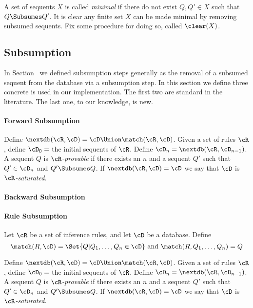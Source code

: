\begin{definition}
  A set of sequents $X$ is called \emph{minimal} if there do not exist $Q,Q'\in
  X$ such that $Q\Subsumes Q'$.  It is clear any finite set $X$ can be made
  minimal by removing subsumed sequents. Fix some procedure
  for doing so, called $\clear(X)$.
\end{definition}



\subsection{Subsumption}

In Section~\label{prop.sec.search} we defined subsumption steps generally as
the removal of a subsumed sequent from the database via a subsumption step.
In this section we define three concrete  is used in our implementation.
The first two are standard in the literature.  The last one, to our knowledge,
is new.

\paragraph{Forward Subsumption}

\begin{definition}
  Define $\nextdb(\cR, \cD) = \cD\Union \match(\cR, \cD)$.
  Given a set of rules $\cR$, define $\cD_0 =$ the initial sequents
  of $\cR$.  Define $\cD_n =\nextdb(\cR, \cD_{n-1})$.
  A sequent $Q$ is \emph{$\cR$-provable} if there exists an
  $n$ and a sequent $Q'$ such that $Q'\in\cD_n$ and $Q'\Subsumes Q$.
  If $\nextdb(\cR, \cD) = \cD$ we say that $\cD$ is \emph{$\cR$-saturated}.
\end{definition}

\paragraph{Backward Subsumption}


\paragraph{Rule Subsumption}

\begin{definition}
  Let $\cR$ be a set of inference rules, and let $\cD$ be a database.
  Define
  \[
  \match(R, \cD) = \Set{Q | Q_1,\ldots,Q_n\in\cD} \mbox{ and } \match(R, Q_1,\ldots,Q_n)=Q
  \]
\end{definition}

\begin{definition}
  Define $\nextdb(\cR, \cD) = \cD\Union \match(\cR, \cD)$.
  Given a set of rules $\cR$, define $\cD_0 =$ the initial sequents
  of $\cR$.  Define $\cD_n =\nextdb(\cR, \cD_{n-1})$.
  A sequent $Q$ is \emph{$\cR$-provable} if there exists an
  $n$ and a sequent $Q'$ such that $Q'\in\cD_n$ and $Q'\Subsumes Q$.
  If $\nextdb(\cR, \cD) = \cD$ we say that $\cD$ is \emph{$\cR$-saturated}.
\end{definition}


